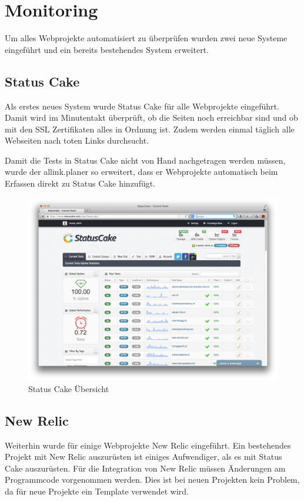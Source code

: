 \section{Monitoring}
\label{sec:monitoring_proof_of_concept}
Um alles Webprojekte automatisiert zu überprüfen wurden zwei neue Systeme eingeführt und ein bereits bestehendes System erweitert.

\subsection{Status Cake}
\label{sub:status_cake}
Als erstes neues System wurde Status Cake für alle Webprojekte eingeführt. Damit wird im Minutentakt überprüft, ob die Seiten noch erreichbar sind und ob mit den SSL Zertifikaten alles in Ordnung ist. Zudem werden einmal täglich alle Webseiten nach toten Links durchsucht.

Damit die Tests in Status Cake nicht von Hand nachgetragen werden müssen, wurde der allink.planer so erweitert, dass er Webprojekte automatisch beim Erfassen direkt zu Status Cake hinzufügt.

\begin{figure}[ht]
\centering
\includegraphics[width=1\textwidth]{images/status_cake.png}
\caption{Status Cake Übersicht}
\label{fig:status_cake}
\end{figure}


\subsection{New Relic}
\label{sub:new_relic}
Weiterhin wurde für einige Webprojekte New Relic eingeführt. Ein bestehendes Projekt mit New Relic auszurüsten ist einiges Aufwendiger, als es mit Status Cake auszurüsten. Für die Integration von New Relic müssen Änderungen am Programmcode vorgenommen werden. Dies ist bei neuen Projekten kein Problem, da für neue Projekte ein Template verwendet wird.

